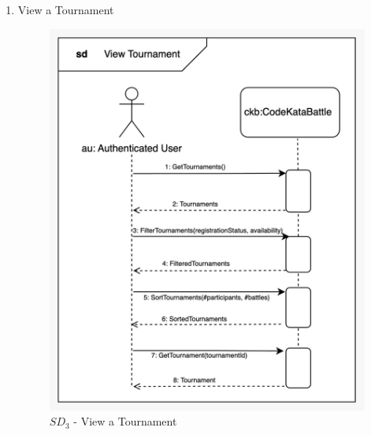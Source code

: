 \begin{enumerate}
    \newpage
    \item View a Tournament
    \begin{figure}[H]
        \centering
        \includegraphics[scale=0.2]{Images/sequence_diagrams/SD-view_tournament.jpeg}
        \caption{$SD_{3}$ - View a Tournament}
    \end{figure}
    

\end{enumerate}
